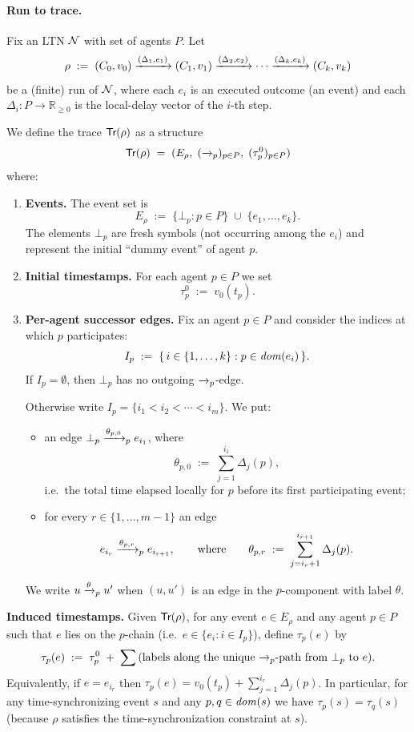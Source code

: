 \paragraph{Run to trace.}
Fix an LTN $\mathcal{N}$ with set of agents $P$. Let
\[
\rho \;:=\; (C_0,v_0)\xrightarrow{(\Delta_1,e_1)}(C_1,v_1)\xrightarrow{(\Delta_2,e_2)}\cdots
\xrightarrow{(\Delta_k,e_k)}(C_k,v_k)
\]
be a (finite) run of $\mathcal{N}$, where each $e_i$ is an executed outcome (an event) and each $\Delta_i:P\to \mathbb{R}_{\ge 0}$ is the local-delay vector of the $i$-th step.

We define the trace $\textsf{Tr}(\rho)$ as a structure
\[
\textsf{Tr}(\rho) \;=\; (E_\rho,\;(\xrightarrow{}_p)_{p\in P},\;(\tau_p^0)_{p\in P})
\]
where:

\begin{enumerate}
\item \textbf{Events.} The event set is
\[
E_\rho \;:=\; \{\bot_p : p\in P\} \;\cup\; \{e_1,\ldots,e_k\}.
\]
The elements $\bot_p$ are fresh symbols (not occurring among the $e_i$) and represent the initial ``dummy event'' of agent $p$.

\item \textbf{Initial timestamps.} For each agent $p\in P$ we set
\[
\tau_p^0 \;:=\; v_0(t_p).
\]

\item \textbf{Per-agent successor edges.} Fix an agent $p\in P$ and consider the indices at which $p$ participates:
\[
I_p \;:=\; \{\, i\in\{1,\ldots,k\} : p\in \mathit{dom}(e_i)\,\}.
\]
If $I_p=\emptyset$, then $\bot_p$ has no outgoing $\xrightarrow{}_p$-edge.

Otherwise write $I_p=\{i_1< i_2<\cdots<i_m\}$. We put:
\begin{itemize}
\item an edge $\bot_p \xrightarrow{\theta_{p,0}}_p e_{i_1}$, where
\[
\theta_{p,0} \;:=\; \sum_{j=1}^{i_1} \Delta_j(p),
\]
i.e.\ the total time elapsed locally for $p$ before its first participating event;
\item for every $r\in\{1,\ldots,m-1\}$ an edge
\[
e_{i_r} \xrightarrow{\theta_{p,r}}_p e_{i_{r+1}},
\qquad\text{where}\qquad
\theta_{p,r} \;:=\; \sum_{j=i_r+1}^{i_{r+1}} \Delta_j(p).
\]
\end{itemize}
We write $u\xrightarrow{\theta}_p u'$ when $(u,u')$ is an edge in the $p$-component with label $\theta$.

\end{enumerate}

\noindent
\textbf{Induced timestamps.} Given $\textsf{Tr}(\rho)$, for any event $e\in E_\rho$ and any agent $p\in P$ such that $e$ lies on the $p$-chain (i.e.\ $e\in\{e_i : i\in I_p\}$), define $\tau_p(e)$ by
\[
\tau_p(e)\;:=\;\tau_p^0 \;+\; \sum \text{(labels along the unique $\xrightarrow{}_p$-path from $\bot_p$ to $e$)}.
\]
Equivalently, if $e=e_{i_r}$ then $\tau_p(e)=v_0(t_p)+\sum_{j=1}^{i_r}\Delta_j(p)$.
In particular, for any time-synchronizing event $s$ and any $p,q\in \mathit{dom}(s)$ we have $\tau_p(s)=\tau_q(s)$ (because $\rho$ satisfies the time-synchronization constraint at $s$).

